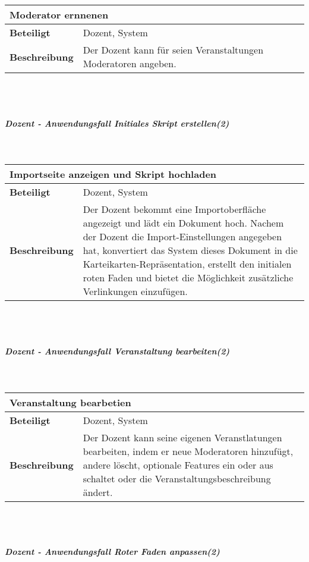 \documentclass[12pt,a4paper]{article}
\begin{document}
\begin{tabular}{l p{10cm}}
\multicolumn{2}{l}{\textbf{Moderator ernnenen}} \\ \hline
\textbf{Beteiligt} & Dozent, System \\ \hline 
\textbf{Beschreibung} & Der Dozent kann für seien Veranstaltungen Moderatoren angeben.\\ 
\hline 
\end{tabular}\\\\
\subparagraph{Dozent - Anwendungsfall \glqq Initiales Skript erstellen\grqq (2)}\mbox{}\\

\begin{tabular}{l p{10cm}}
\multicolumn{2}{l}{\textbf{Importseite anzeigen und Skript hochladen}} \\ \hline
\textbf{Beteiligt} & Dozent, System \\ \hline 
\textbf{Beschreibung} & Der Dozent bekommt eine Importoberfläche angezeigt und lädt ein Dokument hoch. Nachem der Dozent die Import-Einstellungen angegeben hat, konvertiert das System dieses Dokument in die Karteikarten-Repräsentation, erstellt den initialen roten Faden und bietet die Möglichkeit zusätzliche Verlinkungen einzufügen.\\ 
\hline 
\end{tabular}\\\\
\subparagraph{Dozent - Anwendungsfall \glqq Veranstaltung bearbeiten\grqq (2)}\mbox{}\\

\begin{tabular}{l p{10cm}}
\multicolumn{2}{l}{\textbf{Veranstaltung bearbetien}} \\ \hline
\textbf{Beteiligt} & Dozent, System \\ \hline 
\textbf{Beschreibung} & Der Dozent kann seine eigenen Veranstlatungen bearbeiten, indem er neue Moderatoren hinzufügt, andere löscht, optionale Features ein oder aus schaltet oder die Veranstaltungsbeschreibung ändert.\\ 
\hline 
\end{tabular}\\\\
\subparagraph{Dozent - Anwendungsfall \glqq Roter Faden anpassen\grqq (2)}\mbox{}\\
\end{document}
